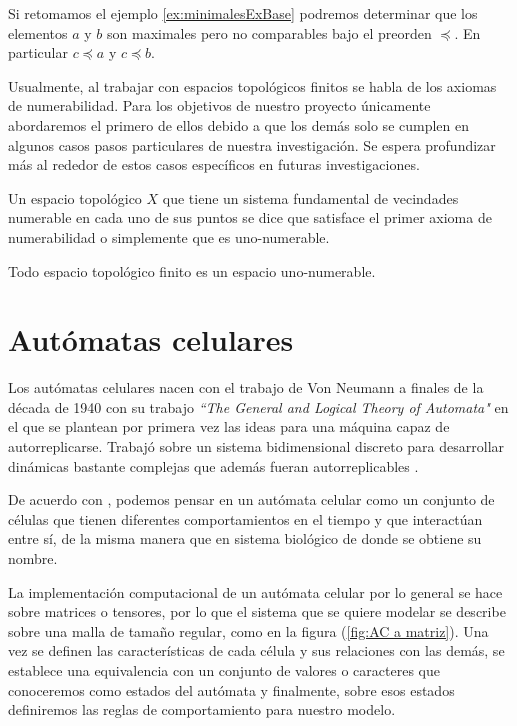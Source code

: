 \begin{example}\label{ex:maximalesExBase}
Si retomamos el ejemplo \ref{ex:minimalesExBase} podremos determinar que los elementos $a$ y $b$ son maximales pero no comparables bajo el preorden $\preceq$. En particular $c\preceq a$ y $c\preceq b$.
\end{example}

Usualmente, al trabajar con espacios topológicos finitos se habla de los axiomas de numerabilidad. Para los objetivos de nuestro proyecto únicamente abordaremos el primero de ellos debido a que los demás solo se cumplen en algunos casos pasos particulares de nuestra investigación. Se espera profundizar más al rededor de estos casos específicos en futuras investigaciones.

\begin{definition}\label{def:espacio1Numerable}
Un espacio topológico $X$ que tiene un sistema fundamental de vecindades numerable en cada uno de sus puntos se dice que satisface el primer axioma de numerabilidad o simplemente que es uno-numerable.
\end{definition}

\begin{example}\label{ex:finito1Numerable}
Todo espacio topológico finito es un espacio uno-numerable.
\end{example}

\section{Autómatas celulares}\label{sec:Autómatas celulares}

Los autómatas celulares nacen con el trabajo de Von Neumann a finales de la década de 1940 con su trabajo \textit{``The General and Logical Theory of Automata"} en el que se plantean por primera vez las ideas para una máquina capaz de autorreplicarse. Trabajó sobre un sistema bidimensional discreto para desarrollar dinámicas bastante complejas que además fueran autorreplicables \cite{alfons2010,ACaplicacionesComputacion}.

De acuerdo con \cite{descripcionyAplicaciones}, podemos pensar en un autómata celular como un conjunto de células que tienen diferentes comportamientos en el tiempo y que interactúan entre sí, de la misma manera que en sistema biológico de donde se obtiene su nombre.

La implementación computacional de un autómata celular por lo general se hace sobre matrices o tensores, por lo que el sistema que se quiere modelar se describe sobre una malla de tamaño regular, como en la figura (\ref{fig:AC a matriz}). Una vez se definen las características de cada célula y sus relaciones con las demás, se establece una equivalencia con un conjunto de valores o caracteres que conoceremos como estados del autómata y finalmente, sobre esos estados definiremos las reglas de comportamiento para nuestro modelo.

